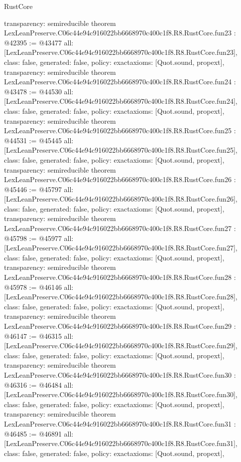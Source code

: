 \begin{lexlean}{RustCore}
\begin{coremodule}
{  transparency: semireducible
}
theorem LexLeanPreserve.C06c44e94c916022bb6668970c400c1f8.R8.RustCore.fun23 : @42395 := @43477 {
  all: [LexLeanPreserve.C06c44e94c916022bb6668970c400c1f8.R8.RustCore.fun23],
  class: false,
  generated: false,
  policy: exact{axioms: [Quot.sound, propext]},
  transparency: semireducible
}
theorem LexLeanPreserve.C06c44e94c916022bb6668970c400c1f8.R8.RustCore.fun24 : @43478 := @44530 {
  all: [LexLeanPreserve.C06c44e94c916022bb6668970c400c1f8.R8.RustCore.fun24],
  class: false,
  generated: false,
  policy: exact{axioms: [Quot.sound, propext]},
  transparency: semireducible
}
theorem LexLeanPreserve.C06c44e94c916022bb6668970c400c1f8.R8.RustCore.fun25 : @44531 := @45445 {
  all: [LexLeanPreserve.C06c44e94c916022bb6668970c400c1f8.R8.RustCore.fun25],
  class: false,
  generated: false,
  policy: exact{axioms: [Quot.sound, propext]},
  transparency: semireducible
}
theorem LexLeanPreserve.C06c44e94c916022bb6668970c400c1f8.R8.RustCore.fun26 : @45446 := @45797 {
  all: [LexLeanPreserve.C06c44e94c916022bb6668970c400c1f8.R8.RustCore.fun26],
  class: false,
  generated: false,
  policy: exact{axioms: [Quot.sound, propext]},
  transparency: semireducible
}
theorem LexLeanPreserve.C06c44e94c916022bb6668970c400c1f8.R8.RustCore.fun27 : @45798 := @45977 {
  all: [LexLeanPreserve.C06c44e94c916022bb6668970c400c1f8.R8.RustCore.fun27],
  class: false,
  generated: false,
  policy: exact{axioms: [Quot.sound, propext]},
  transparency: semireducible
}
theorem LexLeanPreserve.C06c44e94c916022bb6668970c400c1f8.R8.RustCore.fun28 : @45978 := @46146 {
  all: [LexLeanPreserve.C06c44e94c916022bb6668970c400c1f8.R8.RustCore.fun28],
  class: false,
  generated: false,
  policy: exact{axioms: [Quot.sound, propext]},
  transparency: semireducible
}
theorem LexLeanPreserve.C06c44e94c916022bb6668970c400c1f8.R8.RustCore.fun29 : @46147 := @46315 {
  all: [LexLeanPreserve.C06c44e94c916022bb6668970c400c1f8.R8.RustCore.fun29],
  class: false,
  generated: false,
  policy: exact{axioms: [Quot.sound, propext]},
  transparency: semireducible
}
theorem LexLeanPreserve.C06c44e94c916022bb6668970c400c1f8.R8.RustCore.fun30 : @46316 := @46484 {
  all: [LexLeanPreserve.C06c44e94c916022bb6668970c400c1f8.R8.RustCore.fun30],
  class: false,
  generated: false,
  policy: exact{axioms: [Quot.sound, propext]},
  transparency: semireducible
}
theorem LexLeanPreserve.C06c44e94c916022bb6668970c400c1f8.R8.RustCore.fun31 : @46485 := @46891 {
  all: [LexLeanPreserve.C06c44e94c916022bb6668970c400c1f8.R8.RustCore.fun31],
  class: false,
  generated: false,
  policy: exact{axioms: [Quot.sound, propext]},
}
\end{coremodule}
\end{lexlean}
